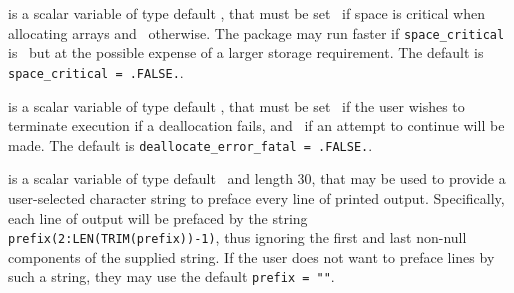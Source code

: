 \documentclass{galahad}
\begin{document}
\begin{description}
 is a scalar variable of type default \logical,
that must be set \true\ if space is critical when allocating arrays
and  \false\ otherwise. The package may run faster if
{\tt space\_critical} is \false\ but at the possible expense of a larger
storage requirement. The default is {\tt space\_critical = .FALSE.}.

 is a scalar variable of type default \logical,
that must be set \true\ if the user wishes to terminate execution if
a deallocation  fails, and \false\ if an attempt to continue
will be made. The default is {\tt deallocate\_error\_fatal = .FALSE.}.

 is a scalar variable of type default \character\
and length 30, that may be used to provide a user-selected
character string to preface every line of printed output.
Specifically, each line of output will be prefaced by the string
{\tt prefix(2:LEN(TRIM(prefix))-1)},
thus ignoring the first and last non-null components of the
supplied string. If the user does not want to preface lines by such
a string, they may use the default {\tt prefix = ""}.

\end{description}

\end{document}
